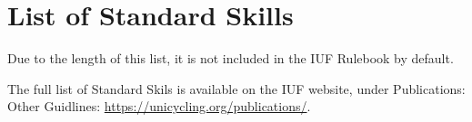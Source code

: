 \chapter{List of Standard Skills \label{chap:freestyle_std-skills-list}}

Due to the length of this list, it is not included in the IUF Rulebook by default.

The full list of Standard Skils is available on the IUF website, under Publications: Other Guidlines: \url{https://unicycling.org/publications/}.